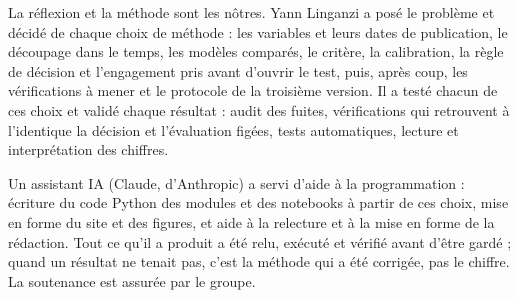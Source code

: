 La réflexion et la méthode sont les nôtres. Yann Linganzi a posé le problème et décidé de chaque choix de méthode :
les variables et leurs dates de publication, le découpage dans le temps, les modèles comparés, le critère, la
calibration, la règle de décision et l'engagement pris avant d'ouvrir le test, puis, après coup, les vérifications à
mener et le protocole de la troisième version. Il a testé chacun de ces choix et validé chaque résultat : audit des
fuites, vérifications qui retrouvent à l'identique la décision et l'évaluation figées, tests automatiques, lecture et
interprétation des chiffres.

Un assistant IA (Claude, d'Anthropic) a servi d'aide à la programmation : écriture du code Python des modules et des
notebooks à partir de ces choix, mise en forme du site et des figures, et aide à la relecture et à la mise en forme de
la rédaction. Tout ce qu'il a produit a été relu, exécuté et vérifié avant d'être gardé ; quand un résultat ne
tenait pas, c'est la méthode qui a été corrigée, pas le chiffre. La soutenance est assurée par le groupe.
